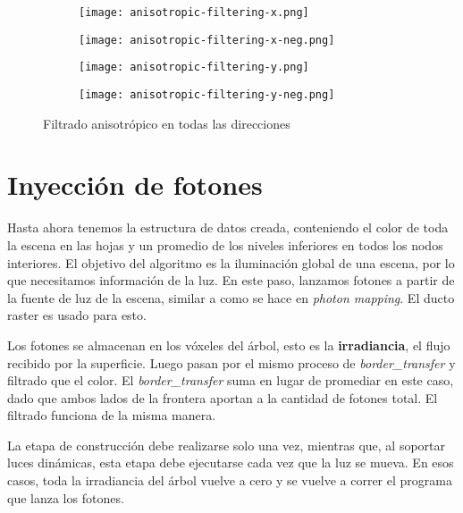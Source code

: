 \begin{figure}
    \begin{center}
        \begin{subfigure}{.24\textwidth}
            \texttt{[image: anisotropic-filtering-x.png]}
        \end{subfigure}
        \begin{subfigure}{.24\textwidth}
            \texttt{[image: anisotropic-filtering-x-neg.png]}
        \end{subfigure}
        \begin{subfigure}{.24\textwidth}
            \texttt{[image: anisotropic-filtering-y.png]}
        \end{subfigure}
        \begin{subfigure}{.24\textwidth}
            \texttt{[image: anisotropic-filtering-y-neg.png]}
        \end{subfigure}
    \end{center}
    \caption{Filtrado anisotrópico en todas las direcciones}
    \label{fig:svo_filtering_anisotropic}
\end{figure}

\section{Inyección de fotones}\label{sec:photon-injection}

Hasta ahora tenemos la estructura de datos creada, conteniendo el color de toda la escena en las hojas y un promedio de los niveles inferiores en todos los nodos interiores.
El objetivo del algoritmo es la iluminación global de una escena, por lo que necesitamos información de la luz.
En este paso, lanzamos fotones a partir de la fuente de luz de la escena, similar a como se hace en \textit{photon mapping}.
El ducto raster es usado para esto.

Los fotones se almacenan en los vóxeles del árbol, esto es la \textbf{irradiancia}, el flujo recibido por la superficie.
Luego pasan por el mismo proceso de \textit{border\_transfer} y filtrado que el color.
El \textit{border\_transfer} suma en lugar de promediar en este caso, dado que ambos lados de la frontera aportan a la cantidad de fotones total.
El filtrado funciona de la misma manera.

La etapa de construcción debe realizarse solo una vez, mientras que, al soportar luces dinámicas, esta etapa debe ejecutarse cada vez que la luz se mueva.
En esos casos, toda la irradiancia del árbol vuelve a cero y se vuelve a correr el programa que lanza los fotones.

